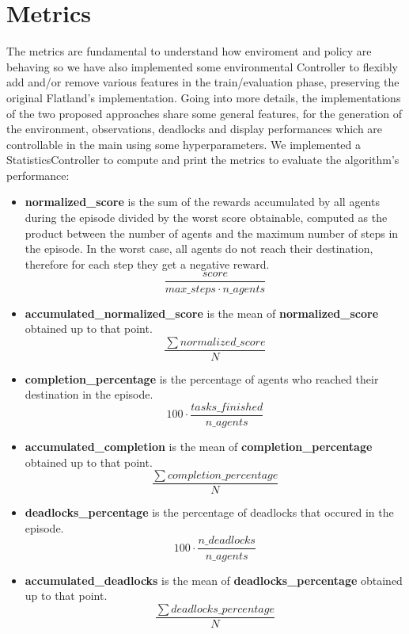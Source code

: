 \section{Metrics}
The metrics are fundamental to understand how enviroment and policy are behaving so  
we have also implemented some environmental Controller to flexibly add and/or remove various features in the train/evaluation phase, preserving the original Flatland’s implementation. Going into more details, the implementations of the two proposed approaches share some general features, for the generation of the environment, observations, deadlocks and display performances which are controllable in the main using some hyperparameters. We implemented a StatisticsController to compute and print the metrics to evaluate the algorithm’s performance:
\begin{itemize}
	\item \textbf{normalized\_score} is the sum of the rewards accumulated by all agents during the episode divided by the worst score obtainable, computed as the product between the number of agents and the maximum number of steps in the episode.
	In the worst case, all agents do not reach their destination, therefore for each step they get a negative reward.
	\begin{equation}{\frac{score}{max\_steps \cdot n\_agents}}\label{eq:score}\end{equation}
	\item \textbf{accumulated\_normalized\_score} is the mean of \textbf{normalized\_score} obtained up to that point.
	\begin{equation}{\frac{\sum{normalized\_score}}{N}}\label{eq:score_acc}\end{equation}
	\item \textbf{completion\_percentage} is the percentage of agents who reached their destination in the episode.
	\begin{equation}{100 \cdot {\frac{tasks\_finished}{n\_agents}}}\label{eq:compl_perc}\end{equation}
	\item \textbf{accumulated\_completion} is the mean of \textbf{completion\_percentage} obtained up to that point.
	\begin{equation}{\frac{\sum{completion\_percentage}}{N}}\label{eq:compl_acc}\end{equation}
	\item \textbf{deadlocks\_percentage} is the percentage of deadlocks that occured in the episode.
	\begin{equation}{100 \cdot {\frac{n\_deadlocks}{n\_agents}}}\label{eq:deads_perc}\end{equation}
	\item \textbf{accumulated\_deadlocks} is the mean of \textbf{deadlocks\_percentage} obtained up to that point.
	\begin{equation}{\frac{\sum {deadlocks\_percentage}}{N}}\label{eq:deads_acc}\end{equation}
\end{itemize}
